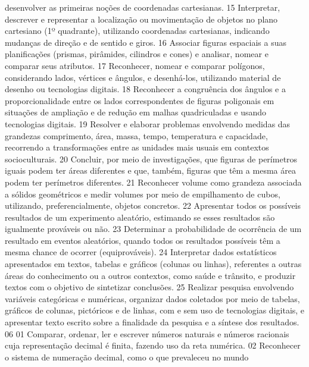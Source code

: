 {{{				desenvolver as primeiras noções de coordenadas cartesianas.
			}
			{15}{%
				Interpretar, descrever e representar a localização ou movimentação de objetos no
				plano cartesiano (1º quadrante), utilizando coordenadas cartesianas, indicando mudanças de
				direção e de sentido e giros.
			}
			{16}{%
				Associar figuras espaciais a suas planificações (prismas, pirâmides, cilindros e
				cones) e analisar, nomear e comparar seus atributos.
			}
			{17}{%
				Reconhecer, nomear e comparar polígonos, considerando lados, vértices e
				ângulos, e desenhá-los, utilizando material de desenho ou tecnologias digitais.
			}
			{18}{%
				Reconhecer a congruência dos ângulos e a proporcionalidade entre os lados
				correspondentes de figuras poligonais em situações de ampliação e de redução em malhas
				quadriculadas e usando tecnologias digitais.
			}
			{19}{%
				Resolver e elaborar problemas envolvendo medidas das grandezas comprimento,
				área, massa, tempo, temperatura e capacidade, recorrendo a transformações entre as unidades
				mais usuais em contextos socioculturais.
			}
			{20}{%
				Concluir, por meio de investigações, que figuras de perímetros iguais podem
				ter áreas diferentes e que, também, figuras que têm a mesma área podem ter perímetros
				diferentes.
			}
			{21}{%
				Reconhecer volume como grandeza associada a sólidos geométricos e medir
				volumes por meio de empilhamento de cubos, utilizando, preferencialmente, objetos concretos.
			}
			{22}{%
				Apresentar todos os possíveis resultados de um experimento aleatório,
				estimando se esses resultados são igualmente prováveis ou não.
			}
			{23}{%
				Determinar a probabilidade de ocorrência de um resultado em eventos aleatórios,
				quando todos os resultados possíveis têm a mesma chance de ocorrer (equiprováveis).
			}
			{24}{%
				Interpretar dados estatísticos apresentados em textos, tabelas e gráficos (colunas
				ou linhas), referentes a outras áreas do conhecimento ou a outros contextos, como saúde e
				trânsito, e produzir textos com o objetivo de sintetizar conclusões.
			}
			{25}{%
				Realizar pesquisa envolvendo variáveis categóricas e numéricas, organizar dados
				coletados por meio de tabelas, gráficos de colunas, pictóricos e de linhas, com e sem uso de
				tecnologias digitais, e apresentar texto escrito sobre a finalidade da pesquisa e a síntese dos
				resultados.
			}
	}
	{06}{%
		{01}{%
				Comparar, ordenar, ler e escrever números naturais e números racionais cuja
				representação decimal é finita, fazendo uso da reta numérica.
			}
			{02}{%
				Reconhecer o sistema de numeração decimal, como o que prevaleceu no mundo
}}}
